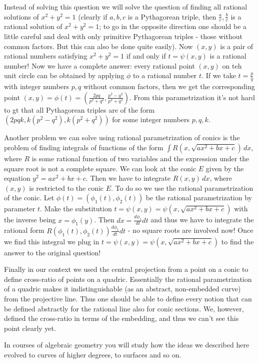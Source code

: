 {{Instead of solving this question we will solve the question of finding all rational solutions of $x^2+y^2=1$ (clearly if $a,b,c$ is a Pythagorean triple, then $\frac{a}{c},\frac{b}{c}$ is a rational solution of $x^2+y^2=1$; to go in the opposite direction one should be a little careful and deal with only primitive Pythagorean triples - those without common factors. But this can also be done quite easily). Now $(x,y)$ is a pair of rational numbers satisfying $x^2+y^2=1$ if and only if $t=\psi(x,y)$ is a rational number! Now we have a complete answer: every rational point $(x,y)$ on teh unit circle can be obtained by applying $\phi$ to a rational number $t$. If we take $t=\frac{p}{q}$ with integer numbers $p,q$ without common factors, then we get the corresponding point $(x,y)=\phi(t)=(\frac{2pq}{p^2+q^2},\frac{p^2-q^2}{p^2+q^2})$. From this parametrization it's not hard to gt that all Pythagorean triples are of the form $(2pqk,k(p^2-q^2),k(p^2+q^2))$ for some integer numbers $p,q,k$.

Another problem we can solve using rational parametrization of conics is the problem of finding integrals of functions of the form $\int \! R(x,\sqrt{ax^2+bx+c}) \, dx$, where $R$ is some rational function of two variables and the expression under the square root is not a complete square. We can look at the conic $E$ given by the equation $y^2=ax^2+bx+c$. Then we have to integrate $R(x,y) \, dx$, where $(x,y)$ is restricted to the conic $E$. To do so we use the rational parametrization of the conic. Let $\phi(t)=(\phi_1(t),\phi_2(t))$ be the rational parametrization by parameter $t$. Make the substitution $t=\psi(x,y)=\psi(x,\sqrt{ax^2+bx+c})$ with the inverse being $x=\phi_1(y)$. Then $dx=\frac{d\phi_1}{dt} dt$ and thus we have to integrate the rational form $R(\phi_1(t),\phi_2(t))\frac{d\phi_1}{dt} dt$ - no square roots are involved now! Once we find this integral we plug in $t=\psi(x,y)=\psi(x,\sqrt{ax^2+bx+c})$ to find the answer to the original question!

Finally in our context we used the central projection from a point on a conic to define cross-ratio of points on a quadric. Essentially the rational parametrization of a quadric makes it indistinguishable (as an abstract, non-embedded curve) from the projective line. Thus one should be able to define every notion that can be defined abstractly for the rational line also for conic sections. We, however, defined the cross-ratio in terms of the embedding, and thus we can't see this point clearly yet.

In courses of algebraic geometry you will study how the ideas we described here evolved to curves of higher degrees, to surfaces and so on.

}}
